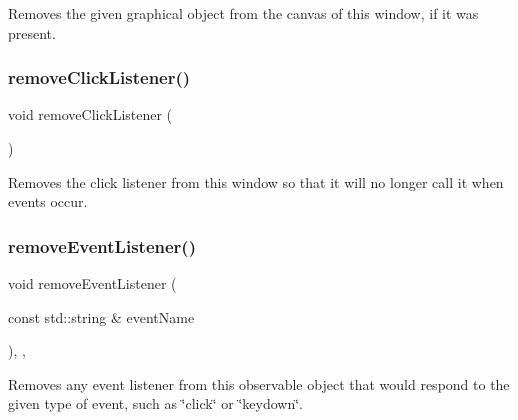 Removes the given graphical object from the canvas of this window, if it was present. 

\mbox{\label{classGWindow_ad39d0325cde6b97ebda4b9d7787c633b}} 
\subsubsection{\texorpdfstring{remove\+Click\+Listener()}{removeClickListener()}}
{\footnotesize\ttfamily void remove\+Click\+Listener (\begin{DoxyParamCaption}{ }\end{DoxyParamCaption})\hspace{0.3cm}{\ttfamily [virtual]}}



Removes the click listener from this window so that it will no longer call it when events occur. 

\mbox{\label{classGObservable_acbcf1ed3a851ad8a3c17ef38d86b481d}} 
\subsubsection{\texorpdfstring{remove\+Event\+Listener()}{removeEventListener()}}
{\footnotesize\ttfamily void remove\+Event\+Listener (\begin{DoxyParamCaption}\item[{const std\+::string \&}]{event\+Name }\end{DoxyParamCaption})\hspace{0.3cm}{\ttfamily [protected]}, {\ttfamily [virtual]}, {\ttfamily [inherited]}}



Removes any event listener from this observable object that would respond to the given type of event, such as \char`\"{}click\char`\"{} or \char`\"{}keydown\char`\"{}. 

\mbox{\label{classGObservable_af51cc35c29a1bd1908609d432decdbb6}} 
